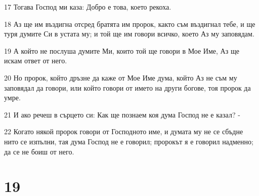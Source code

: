 \par 17 Тогава Господ ми каза: Добро е това, което рекоха.
\par 18 Аз ще им въздигна отсред братята им пророк, както съм въздигнал тебе, и ще туря думите Си в устата му; и той ще им говори всичко, което Аз му заповядам.
\par 19 А който не послуша думите Ми, които той ще говори в Мое Име, Аз ще искам ответ от него.
\par 20 Но пророк, който дръзне да каже от Мое Име дума, който Аз не съм му заповядал да говори, или който говори от името на други богове, тоя пророк да умре.
\par 21 И ако речеш в сърцето си: Как ще познаем коя дума Господ не е казал? -
\par 22 Когато някой пророк говори от Господното име, и думата му не се сбъдне нито се изпълни, тая дума Господ не е говорил; пророкът я е говорил надменно; да се не боиш от него.

\chapter{19}

